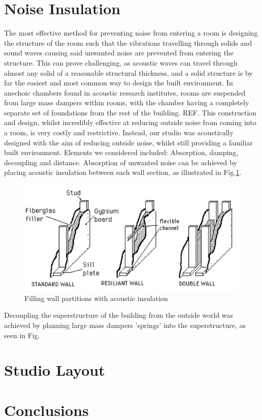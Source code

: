 \documentclass[10pt, twocolumn]{article}
\begin{document}
    \section{Noise Insulation}
        The most effective method for preventing noise from entering a room is designing the structure of the room such that the vibrations travelling through solids and sound waves causing said unwanted noise are prevented from entering the structure.
        This can prove challenging, as acoustic waves can travel through almost any solid of a reasonable structural thickness, and a solid structure is by far the easiest and most common way to design the built environment.
        In anechoic chambers found in acoustic research institutes, rooms are suspended from large mass dampers within rooms, with the chamber having a completely separate set of foundations from the rest of the building. REF.
        This construction and design, whilst incredibly effective at reducing outside noise from coming into a room, is very costly and restrictive.
        Instead, our studio was acoustically designed with the aim of reducing outside noise, whilst still providing a familiar built environment.
        Elements we considered included: Absorption, damping, decoupling and distance.
        Absorption of unwanted noise can be achieved by placing acoustic insulation between each wall section, as illustrated in Fig.\ref{wallFiller}.
        \begin{figure}[H]
            \includegraphics[scale = 0.6]{resources/wallFiller.png}
            \caption{Filling wall partitions with acoustic insulation \cite{UCSC}}
            \label{wallFiller}
            \centering
        \end{figure}
        Decoupling the superstructure of the building from the outside world was achieved by planning large mass dampers 'springs' into the superstructure, as seen in Fig.

    \section{Studio Layout}

    


    \section{Conclusions}

    
    
\end{document}

